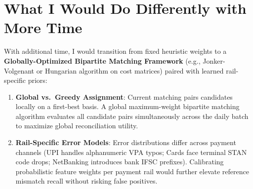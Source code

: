 \documentclass[10pt,a4paper]{article}
\begin{document}
\section{What I Would Do Differently with More Time}
With additional time, I would transition from fixed heuristic weights to a \textbf{Globally-Optimized Bipartite Matching Framework} (e.g., Jonker-Volgenant or Hungarian algorithm on cost matrices) paired with learned rail-specific priors:
\begin{enumerate}
    \item \textbf{Global vs.\ Greedy Assignment}: Current matching pairs candidates locally on a first-best basis. A global maximum-weight bipartite matching algorithm evaluates all candidate pairs simultaneously across the daily batch to maximize global reconciliation utility.
    \item \textbf{Rail-Specific Error Models}: Error distributions differ across payment channels (UPI handles alphanumeric VPA typos; Cards face terminal STAN code drops; NetBanking introduces bank IFSC prefixes). Calibrating probabilistic feature weights per payment rail would further elevate reference mismatch recall without risking false positives.
\end{enumerate}
\end{document}
